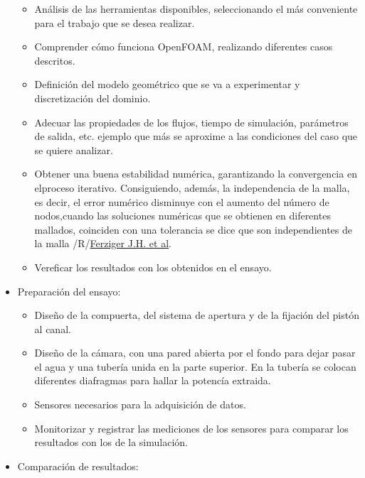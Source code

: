 \begin{itemize}
  \begin{itemize}
  \item
    Análisis de las herramientas disponibles, seleccionando el más
    conveniente para el trabajo que se desea realizar.
  \item
    Comprender cómo funciona OpenFOAM, realizando diferentes casos
    descritos.
  \item
    Definición del modelo geométrico que se va a experimentar y
    discretización del dominio.
  \item
    Adecuar las propiedades de los flujos, tiempo de simulación,
    parámetros de salida, etc. ejemplo que más se aproxime a las
    condiciones del caso que se quiere analizar.
  \item
    Obtener una buena estabilidad numérica, garantizando la convergencia
    en elproceso iterativo. Consiguiendo, además, la independencia de la
    malla, es decir, el error numérico disminuye con el aumento del
    número de nodos,cuando las soluciones numéricas que se obtienen en
    diferentes mallados, coinciden con una tolerancia se dice que son
    independientes de la malla
    /R/\href{Ferziger\%20J.H.,\%20Perić\%20M.;\%20\%22Computational\%20Methods\%20for\%20Fluid\%20Dynamics\%22;\%203rd\%20Edition;\%20Ed.:\%20Springer;\%20New\%20York,\%202002}{Ferziger
    J.H. et al}.
  \item
    Vereficar los resultados con los obtenidos en el ensayo.
  \end{itemize}
\item
  Preparación del ensayo:

  \begin{itemize}
  \item
    Diseño de la compuerta, del sistema de apertura y de la fijación del
    pistón al canal.
  \item
    Diseño de la cámara, con una pared abierta por el fondo para dejar
    pasar el agua y una tubería unida en la parte superior. En la
    tubería se colocan diferentes diafragmas para hallar la potencía
    extraida. 
  \item
    Sensores necesarios para la adquisición de datos.
  \item
    Monitorizar y registrar las mediciones de los sensores para comparar
    los resultados con los de la simulación.
  \end{itemize}
\item
  Comparación de resultados:


\end{itemize}
